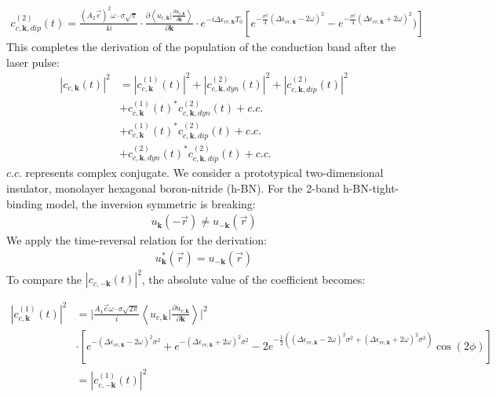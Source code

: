 \begin{equation}
\begin{aligned}
    c^{(2)}_{c,\mathbf k,dip}(t)=\frac{(A_2 \vec e)^2 \omega  \cdot \sigma \sqrt{\pi}}{4i} \cdot \frac{\partial{\left \langle u_{c,\mathbf k}\Big |\frac{\partial u_{v,\mathbf k}}{\partial \mathbf k} \right \rangle}}{\partial {\mathbf k}} \cdot e^{-i\Delta \epsilon_{vc,\mathbf k} T_0} [e^{-\frac{\sigma^2}{4} (\Delta \epsilon_{vc,\mathbf k}-2\omega )^2}-e^{-\frac{\sigma^2}{4} (\Delta \epsilon_{vc,\mathbf k}+2\omega )^2})]
\end{aligned}
\end{equation}
This completes the derivation of the population of the conduction band after the laser pulse:
\begin{equation}
\begin{aligned}
|c_{c,\mathbf k}(t)|^2&=|c^{(1)}_{c,\mathbf k}(t)|^2+|c^{(2)}_{c,\mathbf k,dyn}(t)|^2+|c^{(2)}_{c,\mathbf k,dip}(t)|^2\\
    &+ c^{(1)}_{c,\mathbf k}(t)^* c^{(2)}_{c,\mathbf k,dyn}(t) +c.c.\\
    &+c^{(1)}_{c,\mathbf k}(t)^* c^{(2)}_{c,\mathbf k,dip}(t)+c.c.\\
    &+c^{(2)}_{c,\mathbf k,dyn}(t)^* c^{(2)}_{c,\mathbf k,dip}(t)+c.c.
\end{aligned}
\end{equation}
$c.c.$ represents complex conjugate. We consider a prototypical two-dimensional insulator, monolayer hexagonal boron-nitride (\gls{h-BN}). For the 2-band \gls{h-BN}-tight-binding model, the inversion symmetric is breaking:
\begin{align}
u_{\mathbf k}(-\vec r)\neq u_{-\mathbf k}(\vec r)    
\end{align}
We apply the time-reversal relation for the derivation:
\begin{align}
u^*_{\mathbf k}(\vec r)= u_{-\mathbf k}(\vec r)   
\end{align}
To compare the $|c_{c,-\mathbf k}(t)|^2$, the absolute value of the coefficient becomes:

\begin{equation}
\begin{aligned}
  |c^{(1)}_{c,\mathbf k}(t)|^2 &=\lvert \frac{A_1 \vec e \omega  \cdot \sigma \sqrt{2\pi}}{i} \left \langle
  u_{c,\mathbf k}\Big |\frac{\partial u_{v,\mathbf k}}{\partial \mathbf k} \right \rangle \rvert^2\\ 
 & \cdot [e^{-(\Delta \epsilon_{vc,\mathbf k} - 2\omega )^2 \sigma^2}
    +e^{-(\Delta \epsilon_{vc,\mathbf k} + 2\omega )^2 \sigma^2}
    -2e^{-\frac{1}{2}((\Delta \epsilon_{vc,\mathbf k} - 2\omega )^2 \sigma^2
    +(\Delta \epsilon_{vc,\mathbf k} + 2\omega )^2 \sigma^2)}\cos(2\phi)]\\
    &=  |c^{(1)}_{c,-\mathbf k}(t)|^2
\end{aligned}
\end{equation}

